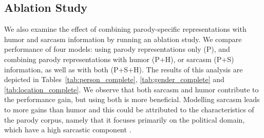 \documentclass[11pt]{article}
\begin{document}
\subsection{Ablation Study} 
We also examine the effect of combining parody-specific representations with humor and sarcasm information by running an ablation study. We compare performance of four models: using parody representations only (P), and combining parody representations with humor (P+H), or sarcasm (P+S) information, as well as with both (P+S+H). The results of this analysis are depicted in Tables~\ref{tab:person_complete}, \ref{tab:gender_complete} and \ref{tab:location_complete}. We observe that both sarcasm and humor contribute to the performance gain, but using both is more beneficial. Modelling sarcasm leads to more gains than humor and this could be attributed to the characteristics of the parody corpus, namely that it focuses primarily on the political domain, which have a high sarcastic component \citep{anderson2017social}.


\end{document}
